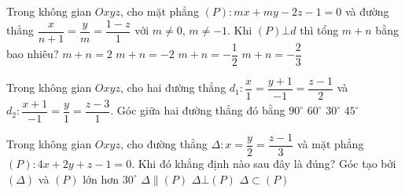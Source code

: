\begin{ex}%
	Trong không gian $Oxyz$, cho mặt phẳng $\left( P \right)\colon mx+my-2z-1=0$ và đường thẳng $\dfrac{x}{n+1}=\dfrac{y}{m}=\dfrac{1-z}{1}$ với $m\ne 0$, $m\ne -1$. Khi $\left( P \right)\bot d$ thì tổng $m+n$ bằng bao nhiêu?
	\choice
	{$m+n=2$}
	{\True $m+n=-2$}
	{$m+n=-\dfrac{1}{2}$}
	{$m+n=-\dfrac{2}{3}$}
\end{ex}

\begin{ex}%
	Trong không gian $Oxyz$, cho hai đường thẳng $d_1:\dfrac{x}{1}=\dfrac{y+1}{-1}=\dfrac{z-1}{2}$ và $d_2:\dfrac{x+1}{-1}=\dfrac{y}{1}=\dfrac{z-3}{1}$. Góc giữa hai đường thẳng đó bằng
	\choice
	{\True $90^\circ $}
	{$60^\circ $}
	{$30^\circ $}
	{$45^\circ $}
\end{ex}

\begin{ex}%
	Trong không gian $Oxyz$, cho đường thẳng $\Delta \colon x=\dfrac{y}{2}=\dfrac{z-1}{3}$ và mặt phẳng $\left( P \right)\colon4x+2y+z-1=0$. Khi đó khẳng định nào sau đây là đúng?
	\choice
	{\True Góc tạo bởi $\left( \Delta \right)$ và $\left( P \right)$ lớn hơn $30^\circ $}
	{$ \Delta \parallel\left( P \right)$}
	{$ \Delta\bot \left( P \right)$}
	{$ \Delta \subset \left( P \right)$}
\end{ex}

